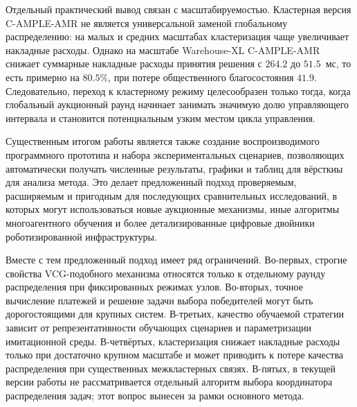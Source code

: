 Отдельный практический вывод связан с масштабируемостью. Кластерная версия C-AMPLE-AMR не является универсальной заменой глобальному распределению: на малых и средних масштабах кластеризация чаще увеличивает накладные расходы. Однако на масштабе Warehouse-XL C-AMPLE-AMR снижает суммарные накладные расходы принятия решения с $264.2$ до $51.5$~мс, то есть примерно на $80.5\%$, при потере общественного благосостояния $41.9$. Следовательно, переход к кластерному режиму целесообразен только тогда, когда глобальный аукционный раунд начинает занимать значимую долю управляющего интервала и становится потенциальным узким местом цикла управления.

Существенным итогом работы является также создание воспроизводимого программного прототипа и набора экспериментальных сценариев, позволяющих автоматически получать численные результаты, графики и таблиц для вёрсткиы для анализа метода. Это делает предложенный подход проверяемым, расширяемым и пригодным для последующих сравнительных исследований, в которых могут использоваться новые аукционные механизмы, иные алгоритмы многоагентного обучения и более детализированные цифровые двойники роботизированной инфраструктуры.

Вместе с тем предложенный подход имеет ряд ограничений. Во-первых, строгие свойства VCG-подобного механизма относятся только к отдельному раунду распределения при фиксированных режимах узлов. Во-вторых, точное вычисление платежей и решение задачи выбора победителей могут быть дорогостоящими для крупных систем. В-третьих, качество обучаемой стратегии зависит от репрезентативности обучающих сценариев и параметризации имитационной среды. В-четвёртых, кластеризация снижает накладные расходы только при достаточно крупном масштабе и может приводить к потере качества распределения при существенных межкластерных связях. В-пятых, в текущей версии работы не рассматривается отдельный алгоритм выбора координатора распределения задач; этот вопрос вынесен за рамки основного метода.

